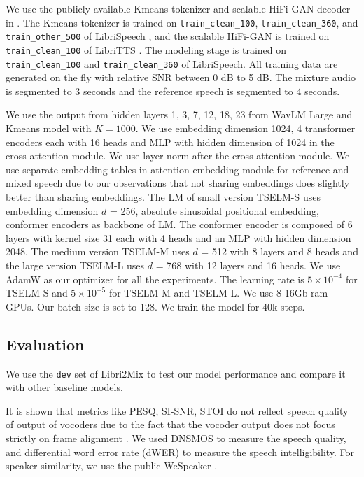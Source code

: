 \documentclass[conference]{IEEEtran}
\begin{document}
We use the publicly available Kmeans tokenizer and scalable 
HiFi-GAN decoder in \cite{speechbrain}. The Kmeans tokenizer
is trained on \texttt{train\_clean\_100}, \texttt{train\_clean\_360}, and \texttt{train\_other\_500} of
LibriSpeech \cite{librispeech}, and the scalable HiFi-GAN is trained on \texttt{train\_clean\_100} of 
LibriTTS \cite{libritts}. The modeling stage is trained on 
\texttt{train\_clean\_100} and \texttt{train\_clean\_360} of LibriSpeech. All training data are 
generated on the fly with relative SNR between 0 dB to 5 dB. The mixture audio is segmented to 3 
seconds and the reference speech is segmented to 4 seconds. 

We use the output from hidden layers 1, 3, 7, 12, 18, 23 from WavLM Large and Kmeans model with 
\(K=1000\).
We use embedding dimension 1024,  4 transformer 
encoders each with 16 heads and MLP with hidden dimension of 1024 in the cross attention module. We 
use layer norm after the cross attention module. 
We use separate embedding tables in attention embedding module for reference and mixed speech due to our observations that not 
sharing embeddings does slightly better than sharing embeddings. The LM of small version TSELM-S uses 
embedding dimension \(d\) = 256, absolute sinusoidal positional embedding, conformer encoders as backbone of LM. The conformer encoder is composed of 
6 layers with kernel size 31 each with 4 heads and an MLP with hidden dimension 2048. The medium version TSELM-M uses \(d\) = 512 with 8 layers and 8 heads and the large version TSELM-L uses 
\(d\) = 768 with 12 layers and 16 heads. We use AdamW as 
our optimizer for all the experiments. The learning rate 
is \(5 \times 10^{-4}\) for TSELM-S and \(5 \times 10^{-5}\) for TSELM-M and TSELM-L. We use 8 16Gb ram GPUs. Our batch size is set to 128. We train the model for 40k steps. 


\subsection{Evaluation}
We use the \texttt{dev} set of Libri2Mix \cite{librimix} to test our model performance and compare it with 
other baseline models. 

It is shown that metrics like PESQ, SI-SNR, STOI do not reflect speech quality of output of 
vocoders due to the fact that the vocoder output does not focus strictly on frame alignment
\cite{tokensplit,selm}. We used DNSMOS \cite{dnsmos} to measure the speech quality, and differential 
word error 
rate (dWER) \cite{dwer} to measure the speech intelligibility. For speaker similarity, we use the 
public WeSpeaker \cite{wespeaker}.
\end{document}
